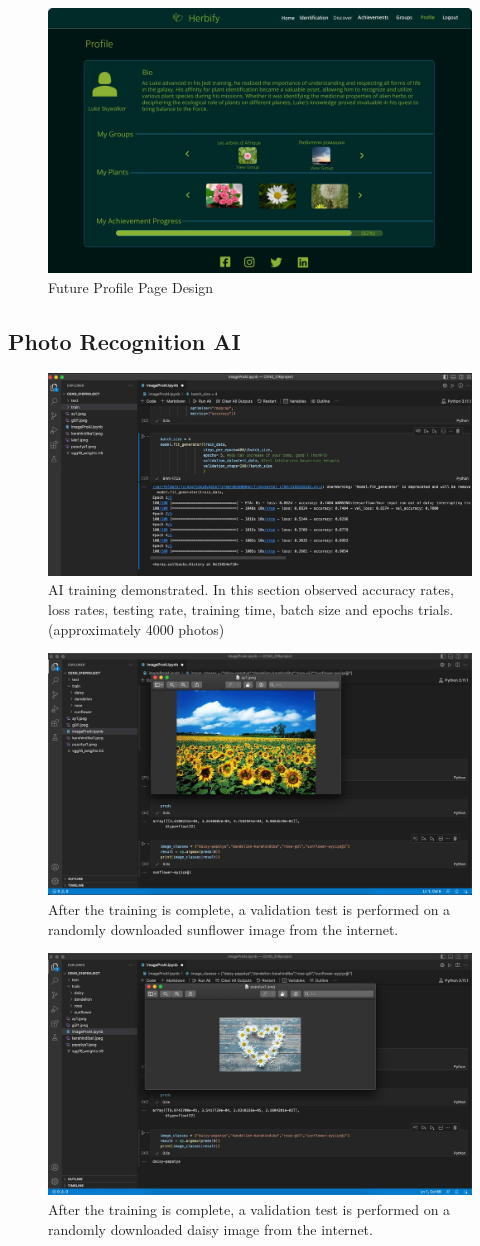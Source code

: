 \documentclass[conference]{IEEEtran}
\begin{document}
\begin{figure}[H]
\centerline{\includegraphics[width=0.48 \textwidth]{images/ProfileFuture.jpg}}
\caption{Future Profile Page Design}
\label{fig:graph1}
\end{figure}




\subsection{Photo Recognition AI}

\begin{figure}[H]
\centerline{\includegraphics[width=0.48 \textwidth]{images/ai2.jpg}}
\caption{AI training demonstrated. In this section observed accuracy rates, loss rates, testing rate, training time, batch size and epochs trials. (approximately 4000 photos)}
\label{fig:graph1}
\end{figure}

\begin{figure}[H]
\centerline{\includegraphics[width=0.48 \textwidth]{images/ai1.jpg}}
\caption{After the training is complete, a validation test is performed on a randomly downloaded sunflower image from the internet.}
\label{fig:graph2}
\end{figure}

\begin{figure}[H]
\centerline{\includegraphics[width=0.48 \textwidth]{images/ai3.jpg}}
\caption{After the training is complete, a validation test is performed on a randomly downloaded daisy image from the internet.}
\label{fig:graph3}
\end{figure}
\end{document}
